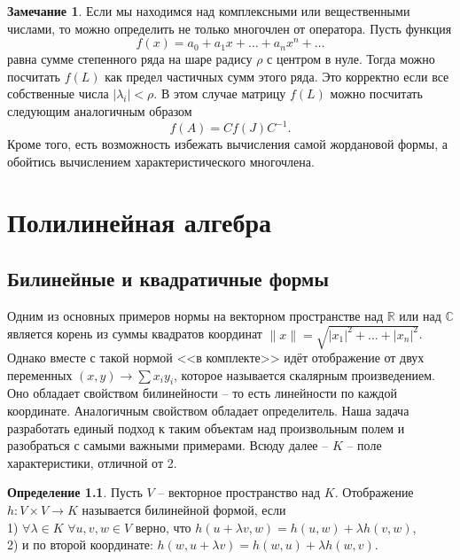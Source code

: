 \documentclass[10pt,a4paper,oneside]{book}
\theoremstyle{definition}
\newtheorem*{rem}{Замечание}
\newtheorem*{defn}{Определение}
\newcommand{\mb}[1]{\mathbb{#1}}
\def\dfn{\begin{defn}}
\def\edfn{\end{defn}}
\def\rm{\begin{rem}}
\def\erm{\end{rem}}
\begin{document}
\rm Если мы находимся над комплексными или вещественными числами, то можно определить не только многочлен от оператора. Пусть функция $$f(x)=a_0 +a_1 x+ \dots + a_n x^n + \dots$$ равна сумме степенного ряда на шаре радису $\rho$ с центром в нуле. Тогда можно посчитать $f(L)$ как предел частичных сумм этого ряда. Это корректно если все собственные числа $|\lambda_i|< \rho$. В этом случае матрицу $f(L)$ можно посчитать следующим аналогичным образом
$$f(A)= C f(J) C^{-1}.$$
Кроме того, есть возможность избежать вычисления самой жордановой формы, а обойтись вычислением характеристического многочлена.
\erm





\chapter{Полилинейная алгебра}

\section{Билинейные и квадратичные формы}

Одним из основных примеров нормы на векторном пространстве над $\mb R$ или над $\mb C$ является корень из суммы квадратов координат $\|x\|=\sqrt{|x_1|^2+\dots +|x_n|^2}$. Однако вместе с такой нормой <<в комплекте>> идёт отображение от двух переменных $(x,y) \to \sum x_iy_i$, которое называется скалярным произведением. Оно обладает свойством билинейности -- то есть линейности по каждой координате. Аналогичным свойством обладает определитель. Наша задача разработать единый подход к таким объектам над произвольным полем и разобраться с самыми важными примерами.  
Всюду далее -- $K$ -- поле характеристики, отличной от 2.

\dfn Пусть $V$ -- векторное пространство над $K$. Отображение $h\colon V\times V \to K$ называется билинейной формой, если\\
1) $\forall \lambda \in K$ $\forall u,v,w \in V$ верно, что $h(u+\lambda v, w) = h(u,w)+\lambda h(v,w)$,\\
2) и по второй координате: $h( w, u+\lambda v) = h(w,u)+\lambda h(w,v)$.
\edfn
\end{document}
